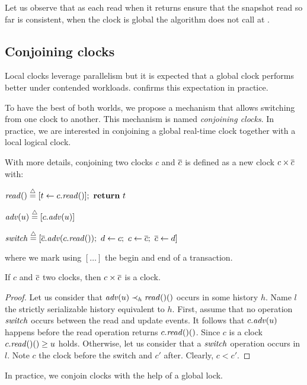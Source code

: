 Let us observe that as each read when it returns ensure that the snapshot read so far is consistent, when the clock is global the algorithm does not call \stmExtend{} at .

\subsection{Conjoining clocks}

Local clocks leverage parallelism but it is expected that a global clock performs better under contended workloads.
 confirms this expectation in practice.

To have the best of both worlds, we propose a mechanism that allows switching from one clock to another.
This mechanism is named \emph{conjoining clocks}.
In practice, we are interested in conjoining a global real-time clock together with a local logical clock.

With more details, conjoining two clocks $c$ and $\barc$ is defined as a new clock $c \times \barc$ with:
\begin{compactitem}
\item $\cread \equaldef [t \assign c.\cread];~\text{\textbf{return}}~t$
\item $\cadv(u) \equaldef [c.\cadv(u)]$
\item $\cswitch \equaldef [\barc.\cadv(c.\cread);~d \assign c;~c \assign \barc;~\barc \assign d]$
\end{compactitem}
where we mark using $[ \ldots ]$ the begin and end of a transaction.

\begin{proposition}
  If $c$ and $\barc$ two clocks, then $c \times \barc$ is a clock.
\end{proposition}

\begin{proof}  
  Let us consider that $\cadv(u) \hb_h \cread()$ occurs in some history $h$.
  Name $l$ the strictly serializable history equivalent to $h$.
  First, assume that no operation $\cswitch$ occurs between the read and update events.
  It follows that $c.\cadv(u)$ happens before the read operation returns $c.\cread()$.
  Since $c$ is a clock $c.\cread() \geq u$ holds.
  Otherwise, let us consider that a $\cswitch$ operation occurs in $l$.
  Note $c$ the clock before the switch and $c'$ after.
  Clearly, $c < c'$.
  
\end{proof}

In practice, we conjoin clocks with the help of a global lock.

